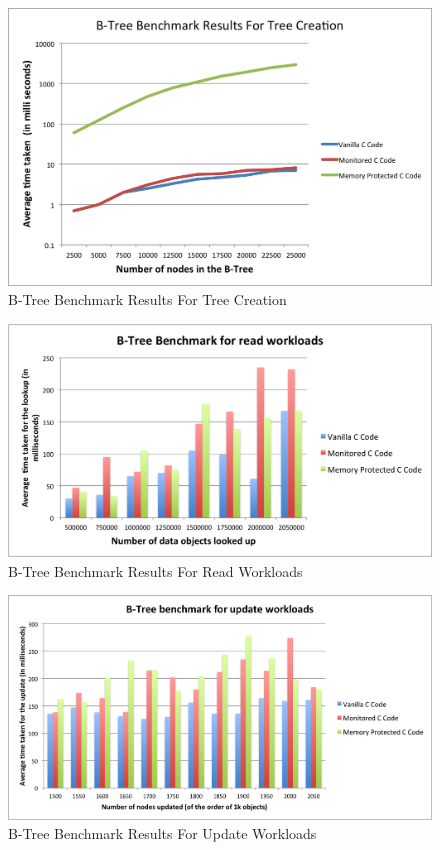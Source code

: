 \begin{figure}[!h]
\caption{B-Tree Benchmark Results For Tree Creation}
\label{fig:create}
\includegraphics[scale=0.4]{./images/create.png}
\end{figure}
\begin{figure}[!h]
\caption{B-Tree Benchmark Results For Read Workloads}
\label{fig:read}
\includegraphics[scale=0.4]{./images/read.png}
\end{figure}
\begin{figure}[!h]
\caption{B-Tree Benchmark Results For Update Workloads}
\label{fig:update}
\includegraphics[scale=0.4]{./images/update.png}
\end{figure}
  

